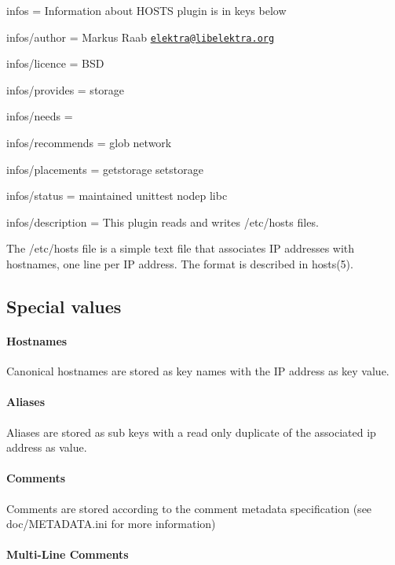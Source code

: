 
\begin{DoxyItemize}
\item infos = Information about H\+O\+S\+T\+S plugin is in keys below
\item infos/author = Markus Raab \href{mailto:elektra@libelektra.org}{\tt elektra@libelektra.\+org}
\item infos/licence = B\+S\+D
\item infos/provides = storage
\item infos/needs =
\item infos/recommends = glob network
\item infos/placements = getstorage setstorage
\item infos/status = maintained unittest nodep libc
\item infos/description = This plugin reads and writes /etc/hosts files.
\end{DoxyItemize}

The /etc/hosts file is a simple text file that associates I\+P addresses with hostnames, one line per I\+P address. The format is described in hosts(5).

\subsection*{Special values}

\paragraph*{Hostnames}

Canonical hostnames are stored as key names with the I\+P address as key value.

\paragraph*{Aliases}

Aliases are stored as sub keys with a read only duplicate of the associated ip address as value.

\paragraph*{Comments}

Comments are stored according to the comment metadata specification (see doc/\+M\+E\+T\+A\+D\+A\+T\+A.\+ini for more information)

\paragraph*{Multi-\/\+Line Comments}

